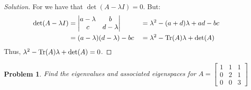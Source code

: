 \documentclass{article}
\theoremstyle{mystyle}
\newtheorem{problem}{Problem}[section]
\begin{document}
\begin{proof}[Solution]
For we have that $\det(A-\lambda I) = 0$. But:
\begin{align*}
    \det(A-\lambda I) &= \begin{vmatrix} a-\lambda & b \\ c & d-\lambda \end{vmatrix} & &= \lambda^2 - (a+d)\lambda + ad - bc\\
    &= (a-\lambda)(d-\lambda) - bc & &= \lambda^{2} - \Tr(A)\lambda + \det(A)
\end{align*}
Thus, $\lambda^2 - \Tr(A) \lambda + \det(A) = 0$.
\end{proof}
\begin{problem}
Find the eigenvalues and associated eigenspaces for $A = \begin{bmatrix} 1 & 1 & 1 \\ 0 & 2 & 1 \\ 0 & 0 & 3\end{bmatrix}$
\end{problem}
\end{document}
